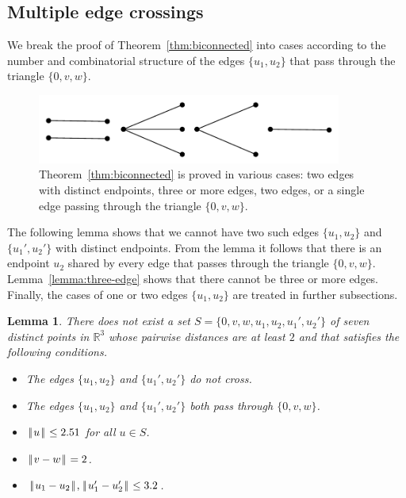 \documentclass[11pt]{amsart}
\newcommand{\ring}[1]{\mathbb{#1}}
\def\|{{\hskip0.1em|\hskip-0.15em|\hskip0.1em}}
\newtheorem{lemma}{Lemma}
\begin{document}
\subsection*{Multiple edge crossings}

We break the proof of Theorem~\ref{thm:biconnected} into cases according
to the number and combinatorial structure of the edges $\{u_1,u_2\}$
that pass through the triangle $\{0,v,w\}$.

\begin{figure}
\begin{center}
\includegraphics[width=10cm]{cases}
\end{center}
\caption{Theorem~\ref{thm:biconnected} is proved in various cases: two edges with
distinct endpoints, three or more edges, two edges, or a single edge
passing through the triangle $\{0,v,w\}$.}
\label{fig:cases}
\end{figure}

The following lemma shows that we cannot have two such edges $\{u_1,u_2\}$ and $\{u_1',u_2'\}$ with distinct endpoints.  From the lemma it follows that there is an endpoint $u_2$ shared by every edge that passes through the
triangle $\{0,v,w\}$.  Lemma~\ref{lemma:three-edge} shows that there cannot be three or more edges.  Finally, the cases of one or two edges $\{u_1,u_2\}$ are treated in further subsections.

\begin{lemma}\label{lemma:double-edge} 
There does not exist a set $S=\{0,v,w,u_1,u_2,u_1',u_2'\}$ of seven distinct points
in $\ring{R}^3$ whose pairwise distances are at least $2$ and that satisfies the following conditions.
\begin{itemize}
\item The edges $\{u_1,u_2\}$ and $\{u_1',u_2'\}$ do not cross.
\item The edges $\{u_1,u_2\}$ and $\{u_1',u_2'\}$ both pass through $\{0,v,w\}$.
\item $\|u\|\le 2.51$ for all $u\in S$.
\item $\|v-w\|=2$.
\item $\|u_1-u_2\|,\|u_1'-u_2'\|\le 3.2$.
\end{itemize}
\end{lemma}
\end{document}
